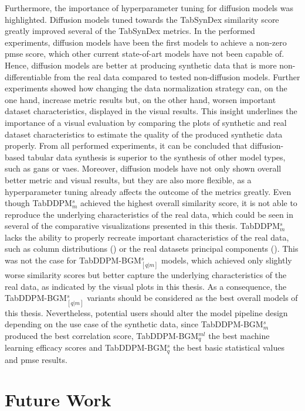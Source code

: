 Furthermore, the importance of hyperparameter tuning for diffusion models was highlighted.
Diffusion models tuned towards the TabSynDex similarity score greatly improved several of the TabSynDex metrics.
In the performed experiments, diffusion models have been the first models to achieve a non-zero \gls{pmse} score, which other current state-of-art models have not been capable of.
Hence, diffusion models are better at producing synthetic data that is more non-differentiable from the real data \cite{chundawat2022UniversalMetricRobust} compared to tested non-diffusion models.
Further experiments showed how changing the data normalization strategy can, on the one hand, increase metric results but, on the other hand, worsen important dataset characteristics, displayed in the visual results.
This insight underlines the importance of a visual evaluation by comparing the plots of synthetic and real dataset characteristics to estimate the quality of the produced synthetic data properly.
From all performed experiments, it can be concluded that diffusion-based tabular data synthesis is superior to the synthesis of other \gls{model} types, such as \glspl{gan} or \glspl{vae}.
Moreover, diffusion models have not only shown overall better metric and visual results, but they are also more flexible, as a hyperparameter tuning already affects the outcome of the metrics greatly.
Even though TabDDPM$^{s}_{m}$ achieved the highest overall similarity score, it is not able to reproduce the underlying characteristics of the real data, which could be seen in several of the comparative visualizations presented in this thesis.
TabDDPM$^{s}_{m}$ lacks the ability to properly recreate important characteristics of the real data, such as column distributions () or the real datasets principal components ().
This was not the case for TabDDPM-BGM$^{s}_{[q|m]}$ models, which achieved only slightly worse similarity scores but better capture the underlying characteristics of the real data, as indicated by the visual plots in this thesis.
As a consequence, the TabDDPM-BGM$^{s}_{[q|m]}$ variants should be considered as the best overall models of this thesis.
Nevertheless, potential users should alter the \gls{model} pipeline design depending on the use case of the synthetic data, since TabDDPM-BGM$^{s}_m$ produced the best correlation score, TabDDPM-BGM$^{ml}_q$ the best machine learning efficacy scores and TabDDPM-BGM$^{s}_q$ the best basic statistical values and \gls{pmse} results.
\newpage

\section{Future Work}
\label{ch:results-futureWork}

